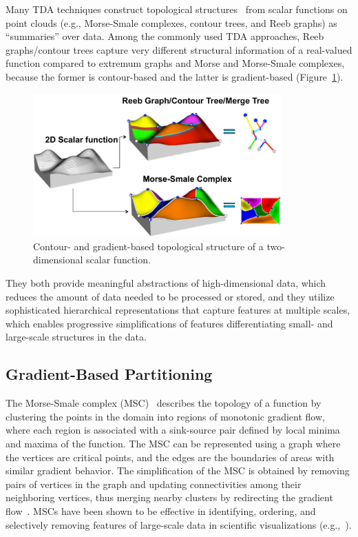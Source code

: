 Many TDA techniques construct topological structures~\cite{Reeb1946,Smale1961} from scalar functions on point clouds (e.g., Morse-Smale complexes, contour trees, and Reeb graphs) as ``summaries'' over data.
%
Among the commonly used TDA approaches, Reeb graphs/contour trees capture very different structural information of a real-valued function compared to extremum graphs and Morse and Morse-Smale complexes, because the former is contour-based and the latter is gradient-based (Figure~\ref{fig:topo-structure}).

\begin{figure}[b]
  \centering
  \includegraphics[width=0.85\textwidth]{figs/chap3/topostructure}
  \caption[Contour and Gradient-based Structures]{Contour- and gradient-based
  topological structure of a two-dimensional scalar function.}
  \label{fig:topo-structure}
\end{figure}

They both provide meaningful abstractions of high-dimensional data, which reduces the amount of data needed to be processed or stored, and they utilize sophisticated hierarchical representations that capture features at multiple scales, which enables progressive simplifications of features differentiating small- and large-scale structures in the data.

\subsection{Gradient-Based Partitioning}
The Morse-Smale complex (MSC)~\cite{EdelsbrunnerHarerNatarajan2003,EdelsbrunnerHarerZomorodian2003} describes the topology of a function by clustering the points in the domain into regions of monotonic gradient flow, where each region is associated with a sink-source pair defined by local minima and maxima of the function.
%
The MSC can be represented using a graph where the vertices are critical points, and the edges are the boundaries of areas with similar gradient behavior.
%
The simplification of the MSC is obtained by removing pairs of vertices in the graph and updating connectivities among their neighboring vertices, thus merging nearby clusters by redirecting the gradient flow~\cite{ComicDeFloriani2011,GuntherReininghausSeidel2013,IuricichFugacciDeFloriani2015}.
%
MSCs have been shown to be effective in identifying, ordering, and selectively removing features of large-scale data in scientific visualizations (e.g.,~\cite{BremerEdelsbrunnerHamann2004,GyulassyBremerPascucci2008,GyulassyNatarajanPascucci2005}).

